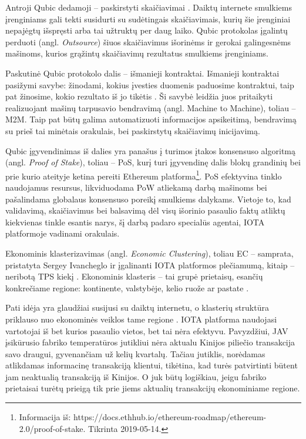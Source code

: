 Antroji Qubic dedamoji – paskirstyti skaičiavimai \cite{iota2017oracles}. Daiktų internete smulkiems įrenginiams gali tekti susidurti su sudėtingais skaičiavimais, kurių šie įrenginiai nepajėgtų išspręsti arba tai užtruktų per daug laiko. Qubic protokolas įgalintų perduoti (angl. \textit{Outsource}) šiuos skaičiavimus išorinėms ir gerokai galingesnėms mašinoms, kurios grąžintų skaičiavimų rezultatus smulkiems įrenginiams.

Paskutinė Qubic protokolo dalis – išmanieji kontraktai. Išmanieji kontraktai pasižymi savybe: žinodami, kokius įvesties duomenis paduosime kontraktui, taip pat žinosime, kokio rezultato iš jo tikėtis \cite{iota2017oracles}. Ši savybė leidžia juos pritaikyti realizuojant mašinų tarpusavio bendravimą (angl. Machine to Machine), toliau – M2M. Taip pat būtų galima automatizuoti informacijos apsikeitimą, bendravimą su prieš tai minėtais orakulais, bei paskirstytų skaičiavimų inicijavimą.

Qubic įgyvendinimas iš dalies yra panašus į turimos įtakos konsensuso algoritmą (angl. \textit{Proof of Stake}), toliau – PoS, kurį turi įgyvendinę dalis blokų grandinių bei prie kurio ateityje ketina pereiti Ethereum platforma\footnote{Informacija iš: https://docs.ethhub.io/ethereum-roadmap/ethereum-2.0/proof-of-stake. Tikrinta 2019-05-14.}. PoS efektyvina tinklo naudojamus resursus, likviduodama PoW atliekamą darbą mašinoms bei pašalindama globalaus konsensuso poreikį smulkiems dalykams. Vietoje to, kad validavimą, skaičiavimus bei balsavimą dėl visų išorinio pasaulio faktų atliktų kiekvienas tinkle esantis narys, šį darbą padaro specialūs agentai, IOTA platformoje vadinami orakulais.





Ekonominis klasterizavimas (angl. \textit{Economic Clustering}), toliau EC – samprata, pristatyta Sergey Ivancheglo ir įgalinanti IOTA platformos plečiamumą, kitaip – neribotą TPS kiekį \cite{sergey2018economic}.
Ekonominis klasteris – tai grupė prietaisų, esančių konkrečiame regione: kontinente, valstybėje, kelio ruože ar pastate \cite{sergey2018economic}. 

Pati idėja yra glaudžiai susijusi su daiktų internetu, o klasterių struktūra priklauso nuo ekonominės veiklos tame regione \cite{sergey2018economic}. IOTA platforma naudojasi vartotojai iš bet kurios pasaulio vietos, bet tai nėra efektyvu. Pavyzdžiui, JAV įsikūrusio fabriko temperatūros jutikliui nėra aktualu Kinijos piliečio transakcija savo draugui, gyvenančiam už kelių kvartalų. Tačiau jutiklis, norėdamas atlikdamas informacinę transakciją klientui, tikėtina, kad turės patvirtinti būtent jam neaktualią transakciją iš Kinijos. O juk būtų logiškiau, jeigu fabriko prietaisai turėtų prieigą tik prie jiems aktualių transakcijų ekonominiame regione.

